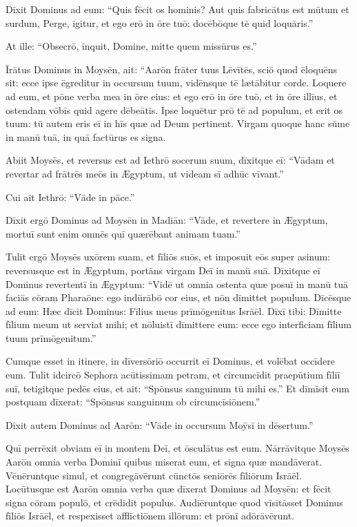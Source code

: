 Dīxit Dominus ad eum: ``Quis fēcit os hominis?
Aut quis fabricātus est mūtum et surdum,
Perge, igitur, et ego erō in ōre tuō:
docēbōque tē quid loquāris.''

At ille: ``Obsecrō, inquit, Domine,
mitte quem missūrus es.''

Īrātus Dominus in Moysēn, ait: ``Aarōn frāter tuus Lēvītēs,
sciō quod ēloquēns sit: ecce ipse ēgreditur in occursum tuum,
vidēnsque tē lætābitur corde.
Loquere ad eum, et pōne verba mea in ōre eius:
et ego erō in ōre tuō, et in ōre illīus,
et ostendam vōbīs quid agere dēbeātis.
Ipse loquētur prō tē ad populum,
et erit os tuum:
tū autem eris eī in hīs quæ ad Deum pertinent.
Virgam quoque hanc sūme in manū tuā,
in quā factūrus es signa.

Abiit Moysēs, et reversus est ad Iethrō socerum suum,
dīxitque eī: ``Vādam et revertar ad frātrēs meōs in Ægyptum,
ut videam sī adhūc vīvant.''

Cui ait Iethrō: ``Vāde in pāce.''

Dīxit ergō Dominus ad Moysēn in Madiān: ``Vāde, et revertere in Ægyptum,
mortuī sunt enim omnēs quī quærēbant animam tuam.''

Tulit ergō Moysēs uxōrem suam, et fīliōs suōs,
et imposuit eōs super asinum: reversusque est in Ægyptum,
portāns virgam Deī in manū suā. Dīxitque eī Dominus revertentī
in Ægyptum: ``Vidē ut omnia ostenta quæ posuī in manū tuā
faciās cōram Pharaōne: ego indūrābō cor eius,
et nōn dīmittet populum. Dīcēsque ad eum: Hæc
dīcit Dominus: Fīlius meus prīmōgenitus Isrāēl.
Dīxī tibi: Dīmitte fīlium meum ut serviat mihi;
et nōluistī dīmittere eum:
ecce ego interficiam fīlium tuum prīmōgenitum.''

Cumque esset in itinere, in dīversōriō
occurrit eī Dominus, et volēbat occīdere eum. 
Tulit idcircō Sephora acūtissimam petram,
et circumcīdit praepūtium fīliī suī, tetigitque pedēs eius,
et ait: ``Spōnsus sanguinum tū mihi es.''
Et dīmīsit eum postquam dīxerat: ``Spōnsus sanguinum ob circumcīsiōnem.''

Dīxit autem Dominus ad Aarōn: ``Vāde in occursum Moȳsī
in dēsertum.'' 

Quī perrēxit obviam eī in montem Deī, et ōsculātus est eum.
Nārrāvitque Moysēs Aarōn omnia verba Dominī quibus miserat eum,
et signa quæ mandāverat. Vēnēruntque simul, et congregāvērunt
cūnctōs seniōrēs fīliōrum Isrāēl.
Locūtusque est Aarōn omnia verba quæ dīxerat Dominus ad Moysēn: et
fēcit signa cōram populō, et crēdidit populus.
Audiēruntque quod vīsitāsset Dominus fīliōs Isrāēl,
et respexisset afflīctiōnem illōrum: et prōnī adōrāvērunt.
